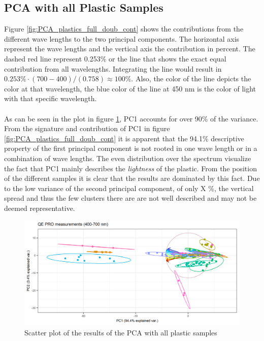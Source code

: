 \subsection{PCA with all Plastic Samples}
Figure \ref{fig:PCA_plastics_full_doub_cont} shows the contributions from the different wave lengths to the two principal components. The horizontal axis represent the wave lengths and the vertical axis the contribution in percent. The dashed red line represent 0.253\% or the line that shows the exact equal contribution from all wavelengths. Integrating the line would result in $0.253\% \cdot (700 - 400)/(0.758) \approx 100\%$.%
Also, the color of the line depicts the color at that wavelength, the blue color of the line at 450 nm is the color of light with that specific wavelength. 
\\\\%
As can be seen in the plot in figure \ref{fig:PCA_plastics_only_full_scat}, PC1 accounts for over 90\% of the variance. From the signature and contribution of PC1 in figure \ref{fig:PCA_plastics_full_doub_cont} it is apparent that the 94.1\% descriptive property of the first principal component is not rooted in one wave length or in a combination of wave lengths. The even distribution over the spectrum visualize the fact that PC1 mainly describes the \textit{lightness} of the plastic. From the position of the different samples it is clear that the results are dominated by this fact. Due to the low variance of the second principal component, of only X \%, the vertical spread and thus the few clusters there are are not well described and may not be deemed representative.

\begin{figure}[H]
    \centering
    \includegraphics[width=1\textwidth]{Images/results/PCA_plastics_full_only_scat.png}
    \caption{Scatter plot of the results of the PCA with all plastic samples}
    \label{fig:PCA_plastics_only_full_scat}
\end{figure}


